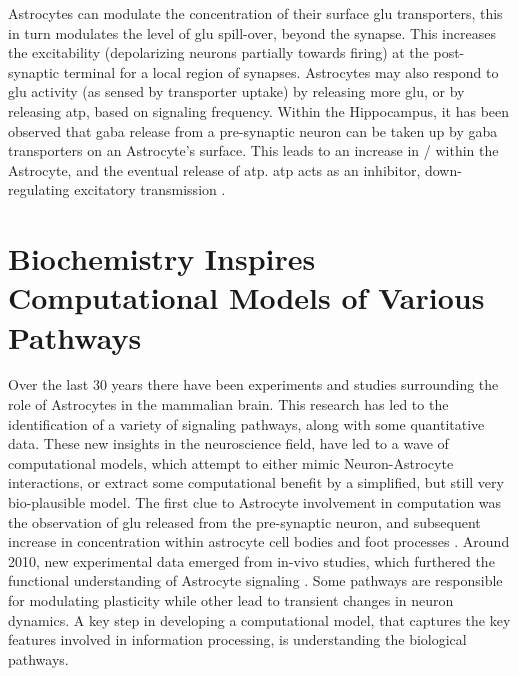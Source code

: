     Astrocytes can modulate the concentration of their surface glu transporters,
    this in turn modulates the level of glu spill-over, beyond the synapse. This
    increases the excitability (depolarizing neurons partially towards firing)
    at the post-synaptic terminal for a local region of synapses. Astrocytes may
    also respond to \Gls{glu} activity (as sensed by transporter uptake) by
    releasing more \Gls{glu}, or by releasing \Gls{atp}, based on signaling
    frequency. Within the Hippocampus, it has been observed that \Gls{gaba}
    release from a pre-synaptic neuron can be taken up by \Gls{gaba}
    transporters on an Astrocyte's surface. This leads to an increase in \na /
    \ca within the Astrocyte, and the eventual release of \Gls{atp}. \Gls{atp}
    acts as an inhibitor, down-regulating excitatory transmission
    \parencite{mederos_2018}.
        

    \section{Biochemistry Inspires Computational Models of Various Pathways}
    Over the last 30 years there have been experiments and studies surrounding the
    role of Astrocytes in the mammalian brain. This research has led to the
    identification of a variety of signaling pathways, along with some
    quantitative data. These new insights in the neuroscience field, have led
    to a wave of computational models, which attempt to either mimic
    Neuron-Astrocyte interactions, or extract some computational benefit by a
    simplified, but still very bio-plausible model. The first clue to Astrocyte
    involvement in computation was the observation of \Gls{glu} released from
    the pre-synaptic neuron, and subsequent increase in \ca concentration
    within astrocyte cell bodies and foot processes \parencite{manninen_2018}. Around
    2010, new experimental data emerged from in-vivo studies, which furthered
    the functional understanding of Astrocyte signaling
    \parencite{manninen_2018}. Some pathways are responsible for modulating
    plasticity while other lead to transient changes in neuron dynamics. A key
    step in developing a computational model, that captures the key features
    involved in information processing, is understanding the biological
    pathways.


